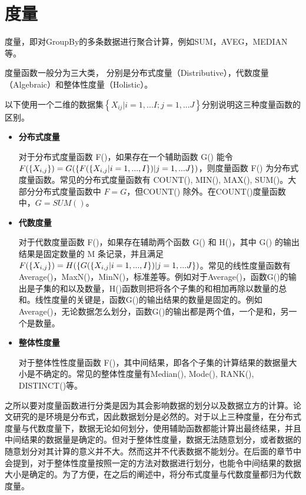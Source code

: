 \section{度量}

度量，即对GroupBy的多条数据进行聚合计算，例如SUM，AVEG，MEDIAN等。

度量函数一般分为三大类， 分别是分布式度量（Distributive），代数度量（Algebraic）和整体性度量（Holistic）。

以下使用一个二维的数据集$\left\{ {X}_{ij}|i=1,...I; j=1,...J \right\}$分别说明这三种度量函数的区别。

\begin{itemize}

\item \textbf{分布式度量}

对于分布式度量函数 F()，如果存在一个辅助函数 G() 能令 $F(\text\{ {X}_{i,j} \text\}) = G(\text\{ F(\text\{ {X}_{i,j}|i=1,...,I \text\})|j=1,...J \text\})$，则度量函数 F() 为分布式度量函数。常见的分布式度量函数有 COUNT(), MIN(), MAX(), SUM()。大部分分布式度量函数中 $F=G$，但COUNT() 除外。在COUNT()度量函数中，$G=SUM()$。

\item \textbf{代数度量}

对于代数度量函数 F()，如果存在辅助两个函数 G() 和 H()，其中 G() 的输出结果是固定数量的 M 条记录，并且满足$F(\text\{ {X}_{i,j} \text\}) = H(\text\{ G(\text\{ {X}_{i,j}|i=1,...,I \text\})|j=1,...J \text\})$。常见的线性度量函数有Average()，MaxN()，MinN()，标准差等。例如对于Average()，函数G()的输出是子集的和以及数量，H()函数则把将各个子集的和相加再除以数量的总和。线性度量的关键是，函数G()的输出结果的数量是固定的。例如Average()，无论数据怎么划分，函数G()的输出都是两个值，一个是和，另一个是数量。

\item \textbf{整体性度量}

对于整体性性度量函数 F()，其中间结果，即各个子集的计算结果的数据量大小是不确定的。常见的整体性度量有Median(), Mode(), RANK(), DISTINCT()等。

\end{itemize}

之所以要对度量函数进行分类是因为其会影响数据的划分以及数据立方的计算。论文研究的是环境是分布式，因此数据划分是必然的。对于以上三种度量，在分布式度量与代数度量下，数据无论如何划分，使用辅助函数都能计算出最终结果，并且中间结果的数据量是确定的。但对于整体性度量，数据无法随意划分，或者数据的随意划分对其计算的意义并不大。然而这并不代表数据不能划分。在后面的章节中会提到，对于整体性度量按照一定的方法对数据进行划分，也能令中间结果的数据大小是确定的。为了方便，在之后的阐述中，将分布式度量与代数度量都归为代数度量。

